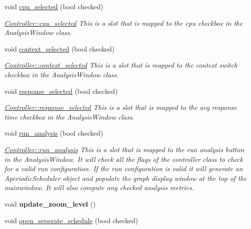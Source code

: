 \begin{DoxyCompactItemize}
void \hyperlink{classController_ac9238da3e2cdd53dbc2a08cf9a55d4d2}{cpu\+\_\+selected} (bool checked)
\begin{DoxyCompactList}\small\item\em \hyperlink{classController_ac9238da3e2cdd53dbc2a08cf9a55d4d2}{Controller\+::cpu\+\_\+selected} This is a slot that is mapped to the cpu checkbox in the Analysis\+Window class. \end{DoxyCompactList}\item 
void \hyperlink{classController_a1573db92761b7e61b6dcace9c97aebf5}{context\+\_\+selected} (bool checked)
\begin{DoxyCompactList}\small\item\em \hyperlink{classController_a1573db92761b7e61b6dcace9c97aebf5}{Controller\+::context\+\_\+selected} This is a slot that is mapped to the context switch checkbox in the Analysis\+Window class. \end{DoxyCompactList}\item 
void \hyperlink{classController_a04531b0d9ee8f02677b1a562a2607ada}{response\+\_\+selected} (bool checked)
\begin{DoxyCompactList}\small\item\em \hyperlink{classController_a04531b0d9ee8f02677b1a562a2607ada}{Controller\+::response\+\_\+selected} This is a slot that is mapped to the avg response time checkbox in the Analysis\+Window class. \end{DoxyCompactList}\item 
void \hyperlink{classController_a7ff7d2d0e8614494020bf5e35dc663a8}{run\+\_\+analysis} (bool checked)
\begin{DoxyCompactList}\small\item\em \hyperlink{classController_a7ff7d2d0e8614494020bf5e35dc663a8}{Controller\+::run\+\_\+analysis} This is a slot that is mapped to the run analysis button in the Analysis\+Window. It will check all the flags of the controller class to check for a valid run configuration. If the run configuration is valid it will generate an Aperiodic\+Scheduler object and populate the graph display window at the top of the mainwindow. It will also compute any checked analysis metrics. \end{DoxyCompactList}\item 
\mbox{\label{classController_a115dc63f10237164d2da71a0a0b6cf88}} 
void {\bfseries update\+\_\+zoom\+\_\+level} ()
\item 
void \hyperlink{classController_aeec075efe687085d150d1e47504485c2}{open\+\_\+seperate\+\_\+schedule} (bool checked)

\end{DoxyCompactItemize}
